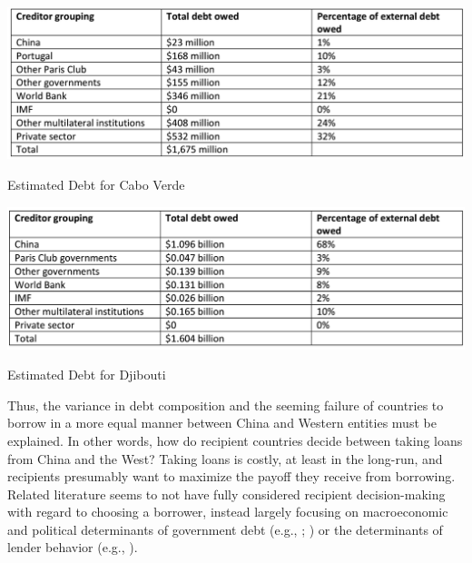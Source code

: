 \documentclass[12pt]{article}
\begin{document}
\begin{table}
    \centering
    \includegraphics[scale=0.5]{Figures/CaboVerde.png}
    \caption{Estimated Debt for Cabo Verde}
    \vspace{1cm}
    \includegraphics[scale=0.5025]{Figures/Djibouti.png}
    \caption{Estimated Debt for Djibouti}
\end{table}

Thus, the variance in debt composition and the seeming failure of countries to borrow in a more equal manner between China and Western entities must be explained. In other words, how do recipient countries decide between taking loans from China and the West? Taking loans is costly, at least in the long-run, and recipients presumably want to maximize the payoff they receive from borrowing. Related literature seems to not have fully considered recipient decision-making with regard to choosing a borrower, instead largely focusing on macroeconomic and political determinants of government debt (e.g., \cite{bittencourt2015} ; \cite{swamy2015}) or the determinants of lender behavior (e.g., \cite{dreher2018}).
\end{document}
